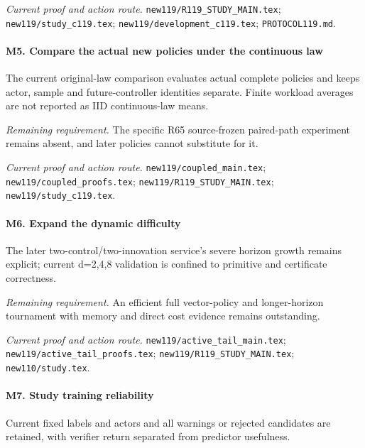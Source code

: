 \par\emph{Current proof and action route.} \nolinkurl{new119/R119_STUDY_MAIN.tex}; \nolinkurl{new119/study_c119.tex}; \nolinkurl{new119/development_c119.tex}; \nolinkurl{PROTOCOL119.md}.

\paragraph{M5. Compare the actual new policies under the continuous law}

The current original-law comparison evaluates actual complete policies and keeps actor, sample and future-controller identities separate. Finite workload averages are not reported as IID continuous-law means.

\par\emph{Remaining requirement.} The specific R65 source-frozen paired-path experiment remains absent, and later policies cannot substitute for it.

\par\emph{Current proof and action route.} \nolinkurl{new119/coupled_main.tex}; \nolinkurl{new119/coupled_proofs.tex}; \nolinkurl{new119/R119_STUDY_MAIN.tex}; \nolinkurl{new119/study_c119.tex}.

\paragraph{M6. Expand the dynamic difficulty}

The later two-control/\allowbreak{}two-innovation service's severe horizon growth remains explicit; current d=2,4,8 validation is confined to primitive and certificate correctness.

\par\emph{Remaining requirement.} An efficient full vector-policy and longer-horizon tournament with memory and direct cost evidence remains outstanding.

\par\emph{Current proof and action route.} \nolinkurl{new119/active_tail_main.tex}; \nolinkurl{new119/active_tail_proofs.tex}; \nolinkurl{new119/R119_STUDY_MAIN.tex}; \nolinkurl{new110/study.tex}.

\paragraph{M7. Study training reliability}

Current fixed labels and actors and all warnings or rejected candidates are retained, with verifier return separated from predictor usefulness.


